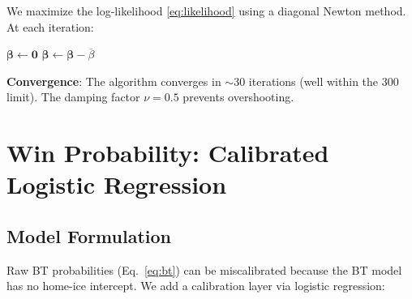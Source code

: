\documentclass[11pt, a4paper]{article}
\begin{document}
We maximize the log-likelihood \eqref{eq:likelihood} using a diagonal Newton method. At each iteration:

\begin{algorithm}[H]
\SetAlgoLined
{}
$\boldsymbol{\beta} \leftarrow \mathbf{0}$\;
$\boldsymbol{\beta} \leftarrow \boldsymbol{\beta} - \overline{\beta}$ 
\Return{$\boldsymbol{\beta}$}
\caption{OT-Aware Bradley-Terry via Iterative MLE}
\label{alg:bt}
\end{algorithm}

\noindent\textbf{Convergence}: The algorithm converges in $\sim$30 iterations (well within the 300 limit). The damping factor $\nu = 0.5$ prevents overshooting.

\section{Win Probability: Calibrated Logistic Regression}
\label{sec:logistic}

\subsection{Model Formulation}

Raw BT probabilities (Eq.~\ref{eq:bt}) can be miscalibrated because the BT model has no home-ice intercept. We add a calibration layer via logistic regression:
\end{document}
